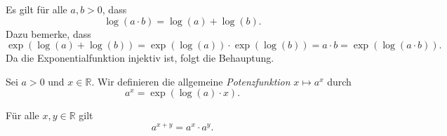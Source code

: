 \documentclass[../main.tex]{subfiles}
\begin{document}
\begin{remark}
Es gilt für alle $a, b > 0$, dass
\[
  \log(a \cdot b) = \log(a) + \log(b).
\]
Dazu bemerke, dass
\[
  \exp(\log(a) + \log(b)) = 
  \exp(\log(a)) \cdot \exp(\log(b))
  = a \cdot b = \exp(\log(a \cdot b)).
\]
Da die Exponentialfunktion injektiv ist,
folgt die Behauptung.
\end{remark}

\begin{definition}
  Sei $a > 0$ und $x \in \mathbb{R}$. Wir definieren
  die allgemeine \emph{Potenzfunktion}
  $x \mapsto a^x$ durch
  \[
    a^x = \exp(\log(a) \cdot x).
  \]
\end{definition}

\begin{remark}
  Für alle $x, y \in \mathbb{R}$ gilt
  \[
    a^{x+y} = a^{x} \cdot a^{y}.
  \]
\end{remark}
\end{document}
